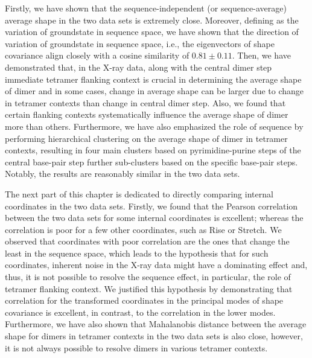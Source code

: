 Firstly, we have shown that the sequence-independent (or sequence-average) average shape in the two data sets is extremely close. 
Moreover, defining  as the variation of groundstate in sequence space, we have shown that the direction of variation of groundstate in sequence space, i.e., the eigenvectors of shape covariance align closely with a cosine similarity of $0.81 \pm 0.11$.
Then, we have demonstrated that, in the X-ray data, along with the central dimer step immediate tetramer flanking context is crucial in determining the average shape of dimer and in some cases, change in average shape can be larger due to change in tetramer contexts than change in central dimer step.
Also, we found that certain flanking contexts systematically influence the average shape of dimer more than others. 
Furthermore, we have also emphasized the role of sequence by performing hierarchical clustering on the average shape of dimer in tetramer contexts, resulting in four main clusters based on pyrimidine-purine steps of the central base-pair step further sub-clusters based on the specific base-pair steps. 
Notably, the results are reasonably similar in the two data sets. 

The next part of this chapter is dedicated to directly comparing internal coordinates in the two data sets.
Firstly, we found that the Pearson correlation between the two data sets for some internal coordinates is excellent; whereas the correlation is poor for a few other coordinates, such as Rise or Stretch.
We observed that coordinates with poor correlation are the ones that change the least in the sequence space, which leads to the hypothesis that for such coordinates, inherent noise in the X-ray data might have a dominating effect and, thus, it is not possible to resolve the sequence effect, in particular, the role of tetramer flanking context.
We justified this hypothesis by demonstrating that correlation for the transformed coordinates in the principal modes of shape covariance is excellent, in contrast, to the correlation in the lower modes.
Furthermore, we have also shown that Mahalanobis distance between the average shape for dimers in tetramer contexts in the two data sets is also close, however, it is not always possible to resolve dimers in various tetramer contexts.

